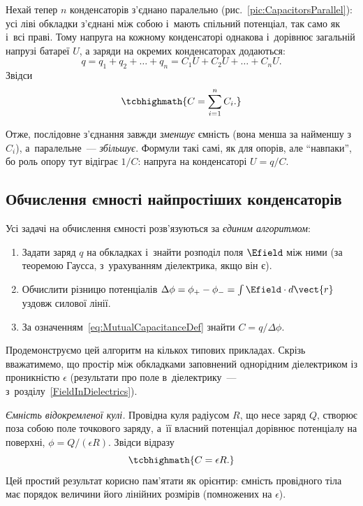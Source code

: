  Нехай тепер $n$ конденсаторів з'єднано паралельно
(рис.~\ref{pic:CapacitorsParallel}): усі ліві обкладки з'єднані між собою і~мають спільний
потенціал, так само як і~всі праві. Тому напруга на кожному конденсаторі однакова
і~дорівнює загальній напрузі батареї $U$, а заряди на окремих конденсаторах додаються:
\begin{equation*}
	q = q_1 + q_2 + \ldots + q_n = C_1 U + C_2 U + \ldots + C_n U.
\end{equation*}
Звідси
\begin{equation}\label{eq:ParallelCap}
	\tcbhighmath{
		C = \sum\limits_{i=1}^n C_i.
	}
\end{equation}

Отже, послідовне з'єднання завжди \emph{зменшує} ємність (вона менша за найменшу з~$C_i$),
а~паралельне~--- \emph{збільшує}. Формули такі самі, як для опорів, але \enquote{навпаки},
бо роль опору тут відіграє $1/C$: напруга на конденсаторі $U = q/C$.


\subsection*{Обчислення ємності найпростіших конденсаторів}




Усі задачі на обчислення ємності розв'язуються за \emph{єдиним алгоритмом}:

\begin{enumerate}
	\item Задати заряд $q$ на обкладках і~знайти розподіл поля $\Efield$ між ними (за
	  теоремою Гаусса, з~урахуванням діелектрика, якщо він є).
	\item Обчислити різницю потенціалів $\Delta\phi = \phi_+ - \phi_- = \int \Efield\cdot
	  d\vect{r}$ уздовж силової лінії.
	\item За означенням~\eqref{eq:MutualCapacitanceDef} знайти $C = q/\Delta\phi$.
\end{enumerate}

Продемонструємо цей алгоритм на кількох типових прикладах. Скрізь вважатимемо, що простір
між обкладками заповнений однорідним діелектриком із проникністю $\epsilon$ (результати
про поле в~діелектрику~--- з~розділу~\ref{FieldInDielectrics}).

\emph{Ємність відокремленої кулі.} Провідна куля радіусом $R$, що несе заряд $Q$, створює
поза собою поле точкового заряду, а~її власний потенціал дорівнює потенціалу на поверхні,
$\phi = Q/(\epsilon R)$. Звідси відразу
\begin{equation}\label{eq:SphereCap}
	\tcbhighmath{
		C = \epsilon R.
	}
\end{equation}
Цей простий результат корисно пам'ятати як орієнтир: ємність провідного тіла має порядок
величини його лінійних розмірів (помножених на $\epsilon$).

